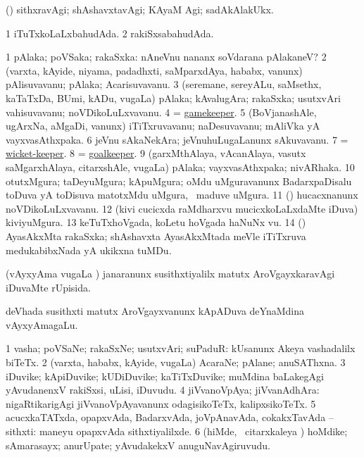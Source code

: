 \noindent
\gl{\nuga}
\bmng
{} (\AmA) sithxravAgi; shAshavxtavAgi; KAyaM Agi; sadAkAlakUkx. 
\emng
\eentry

\bentry
{}
\gl{\gu}
\bmng
\bnum
\num{1} iTuTxkoLaLxbahudAda. 
\num{2} rakiSxsabahudAda. 
\enum
\emng
\eentry

\bentry
{}
\gl{\nA}
\bmng
\bnum
\num{1} pAlaka; poVSaka; rakaSxka:  nAneVnu nananx soVdarana pAlakaneV? 
\num{2} (varxta, kAyide, niyama, padadhxti, saMparxdAya, hababx, \mo vanunx) pAlisuvavanu; pAlaka; Acarisuvavanu. 
\num{3} (seremane, sereyALu, saMsethx, kaTaTxDa, BUmi, kADu, \mo vugaLa) pAlaka; kAvalugAra; rakaSxka; usutxvAri vahisuvavanu; noVDikoLuLxvavanu. 
\num{4} = \hyperref{kandict_g.pdf}{G}{gamekeeper}{gamekeeper}. 
\num{5} (BoVjanashAle, ugArxNa, aMgaDi, \mo vanunx) iTiTxruvavanu; naDesuvavanu; mAliVka yA vayxvasAthxpaka. 
\num{6} jeVnu sAkaNekAra; jeVnuhuLugaLanunx sAkuvavanu. 
\num{7} = \hyperref{kandict_w.pdf}{W}{wicket-keeper}{wicket-keeper}. 
\num{8} = \hyperref{kandict_g.pdf}{G}{goalkeeper}{goalkeeper}. 
\num{9} (garxMthAlaya, vAcanAlaya, vasutx saMgarxhAlaya, citarxshAle, \mo vugaLa) pAlaka; vayxvasAthxpaka; nivARhaka. 
\num{10} otutxMgura; taDeyuMgura; kApuMgura; oMdu uMguravanunx BadarxpaDisalu toDuva yA toDisuva matotxMdu uMgura, \kanmu\ maduve uMgura. 
\num{11} (\pArxparx) hucacxnanunx noVDikoLuLxvavanu. 
\num{12} (kivi cucicxda raMdharxvu mucicxkoLaLxdaMte iDuva) kiviyuMgura. 
\num{13} keTuTxhoVgada, koLetu hoVgada haNuNx \mo vu. 
\num{14} (\Bwvi) AyasAkxMta rakaSxka; shAshavxta AyasAkxMtada meVle iTiTxruva medukabibxNada yA ukikxna tuMDu. 
\enum
\emng
\eentry

\bentry
{}
\gl{\gu}
\bmng
(vAyxyAma \mo vugaLa \vi) janaranunx susithxtiyalilx matutx AroVgayxkaravAgi iDuvaMte rUpisida. 
\emng
\eentry

\bentry
{}
\gl{\nA}
\bmng
deVhada susithxti matutx AroVgayxvanunx kApADuva deYnaMdina vAyxyAmagaLu. 
\emng
\eentry

\bentry
{}
\gl{\nA}
\bmng
\bnum
\num{1} vasha; poVSaNe; rakaSxNe; usutxvAri; suPaduR:  kUsanunx Akeya vashadalilx biTeTx. 
\num{2} (varxta, hababx, kAyide, \mo vugaLa) AcaraNe; pAlane; anuSAThxna. 
\num{3} iDuvike; kApiDuvike; kUDiDuvike; kaTiTxDuvike; muMdina baLakegAgi yAvudanenxV rakiSxsi, uLisi, iDuvudu. 
\num{4} jiVvanoVpAya; jiVvanAdhAra:  nigaRtikarigAgi jiVvanoVpAyavanunx odagisikoTeTx, kalipxsikoTeTx. 
\num{5} acucxkaTATxda, opapxvAda, BadarxvAda, joVpAnavAda, cokakxTavAda -- sithxti:  maneyu opapxvAda sithxtiyalilxde. 
\num{6} (hiMde, \kanmu\ citarxkaleya \vi) hoMdike; sAmarasayx; anurUpate; yAvudakekxV anuguNavAgiruvudu. 
\enum
\emng

